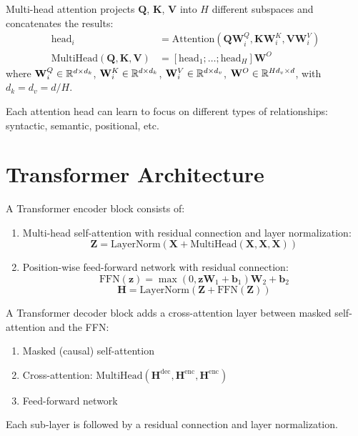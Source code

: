 \begin{definition}
Multi-head attention projects $\mathbf{Q}$, $\mathbf{K}$, $\mathbf{V}$ into
$H$ different subspaces and concatenates the results:
\begin{align}
\text{head}_i &= \text{Attention}(\mathbf{Q}\mathbf{W}_i^Q, \mathbf{K}\mathbf{W}_i^K, \mathbf{V}\mathbf{W}_i^V) \\
\text{MultiHead}(\mathbf{Q}, \mathbf{K}, \mathbf{V}) &= [\text{head}_1; \ldots; \text{head}_H] \mathbf{W}^O
\end{align}
where $\mathbf{W}_i^Q \in \mathbb{R}^{d \times d_k}$, $\mathbf{W}_i^K \in \mathbb{R}^{d \times d_k}$,
$\mathbf{W}_i^V \in \mathbb{R}^{d \times d_v}$, $\mathbf{W}^O \in \mathbb{R}^{Hd_v \times d}$,
with $d_k = d_v = d/H$.
\end{definition}

\begin{remark}
Each attention head can learn to focus on different types of relationships:
syntactic, semantic, positional, etc.
\end{remark}

\section{Transformer Architecture}
\label{sec:att:transformer}

\begin{definition}
A Transformer encoder block consists of:
\begin{enumerate}
    \item Multi-head self-attention with residual connection and layer
          normalization:
          \[
          \mathbf{Z} = \text{LayerNorm}(\mathbf{X} + \text{MultiHead}(\mathbf{X}, \mathbf{X}, \mathbf{X}))
          \]
    \item Position-wise feed-forward network with residual connection:
          \[
          \text{FFN}(\mathbf{z}) = \max(0, \mathbf{z}\mathbf{W}_1 + \mathbf{b}_1)\mathbf{W}_2 + \mathbf{b}_2
          \]
          \[
          \mathbf{H} = \text{LayerNorm}(\mathbf{Z} + \text{FFN}(\mathbf{Z}))
          \]
\end{enumerate}
\end{definition}

\begin{definition}
A Transformer decoder block adds a cross-attention layer between masked
self-attention and the FFN:
\begin{enumerate}
    \item Masked (causal) self-attention
    \item Cross-attention: $\text{MultiHead}(\mathbf{H}^{\text{dec}}, \mathbf{H}^{\text{enc}}, \mathbf{H}^{\text{enc}})$
    \item Feed-forward network
\end{enumerate}
Each sub-layer is followed by a residual connection and layer normalization.
\end{definition}


